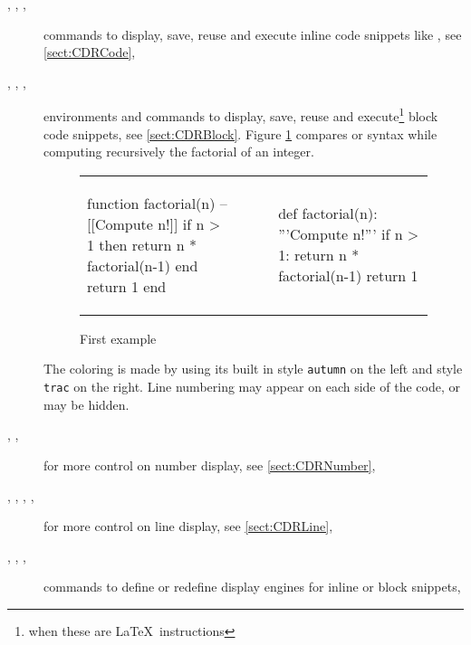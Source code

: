 \documentclass{article}
\begin{document}
\begin{description}
\item[{}, , , ]
commands to display, save, reuse and execute inline code snippets
like , see \ref{sect:CDRCode},
\item[, , , ] environments
and commands to display, save, reuse and execute\footnote{when these are \LaTeX\ instructions} block code snippets, see \ref{sect:CDRBlock}.
Figure \ref{fig:First example} compares  or  syntax while computing recursively the factorial of an integer.
\begin{figure}[h!]
\begin{center}
\setlength{\tabcolsep}{0mm}
\begin{tabular}{p{0.45\linewidth}p{0.05\linewidth}|p{0.05\linewidth}p{0.45\linewidth}}
\begin{CDRBlock}[tags=lua, no space above]
function factorial(n)
  --[[Compute n!]]
  if n > 1 then
    return n * factorial(n-1)
  end
  return 1
end
\end{CDRBlock}
&&&
\begin{CDRBlock}[tags=py, no space above]
def factorial(n):
  '''Compute n!'''
  if n > 1:
    return n * factorial(n-1)
  return 1
\end{CDRBlock}
\end{tabular}
\end{center}
\caption{First example}
\label{fig:First example}
\end{figure}
The coloring is made by  using its built in style \texttt{autumn} on the left and style \texttt{trac} on the right. Line numbering may appear on each side of the code, or may be hidden.
\item[{%
,
,
}]
for more control on number display, see \ref{sect:CDRNumber},
\item[{%
,
,
,
,
}]
for more control on line display, see \ref{sect:CDRLine},
\item[{%
,
,
,
%
}]
commands to define or redefine display engines
for inline or block snippets,

\end{description}
\end{document}
